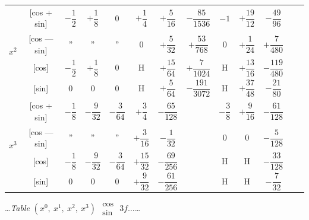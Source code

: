 \documentclass[10pt,a4paper]{article}
\newcommand{\tabletitle}[2]{%
  \begin{center}
  \ldots\textit{Table} #1 $\displaystyle\begin{smallmatrix} \cos \\ \sin \end{smallmatrix}$ #2\ldots
  \end{center}
}
\begin{document}
\begin{center}
\begin{tabular}{|c|c|c|c|c|c|c|c|c|c|c|c|c|}
\hline
\multirow{4}{*}{$x^2$} & [cos + sin] & $-\dfrac{1}{2}$ & $+\dfrac{1}{8}$ & $0$ & $+\dfrac{1}{4}$ & $+\dfrac{5}{16}$ & $-\dfrac{85}{1536}$ & $-1$ & $+\dfrac{19}{12}$ & $-\dfrac{49}{96}$ \\
& [cos --- sin] & $"$ & $"$ & $"$ & $0$ & $+\dfrac{5}{32}$ & $+\dfrac{53}{768}$ & $0$ & $+\dfrac{1}{24}$ & $+\dfrac{7}{480}$ \\
& [cos] & $-\dfrac{1}{2}$ & $+\dfrac{1}{8}$ & $0$ & H & $+\dfrac{15}{64}$ & $+\dfrac{7}{1024}$ & H & $+\dfrac{13}{16}$ & $-\dfrac{119}{480}$ \\
& [sin] & $0$ & $0$ & $0$ & H & $+\dfrac{5}{64}$ & $-\dfrac{191}{3072}$ & H & $+\dfrac{37}{48}$ & $-\dfrac{21}{80}$ \\
\hline
\multirow{4}{*}{$x^3$} & [cos + sin] & $-\dfrac{1}{8}$ & $-\dfrac{9}{32}$ & $-\dfrac{3}{64}$ & $+\dfrac{3}{4}$ & $-\dfrac{65}{128}$ & & $-\dfrac{3}{8}$ & $+\dfrac{9}{16}$ & $-\dfrac{61}{128}$ \\
& [cos --- sin] & $"$ & $"$ & $"$ & $+\dfrac{3}{16}$ & $-\dfrac{1}{32}$ & & $0$ & $0$ & $-\dfrac{5}{128}$ \\
& [cos] & $-\dfrac{1}{8}$ & $-\dfrac{9}{32}$ & $-\dfrac{3}{64}$ & $+\dfrac{15}{32}$ & $-\dfrac{69}{256}$ & & H & H & $-\dfrac{33}{128}$ \\
& [sin] & $0$ & $0$ & $0$ & $+\dfrac{9}{32}$ & $-\dfrac{61}{256}$ & & H & H & $-\dfrac{7}{32}$ \\
\hline
\end{tabular}
\end{center}

\newpage
\tabletitle{$(x^0,\ x^1,\ x^2,\ x^3)$}{$3f\ldots$}
\end{document}
